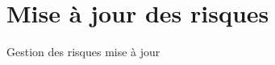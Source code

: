 \section{Mise à jour des risques}
\begin{table}[hp]
	\centering
	\caption{Gestion des risques mise à jour}
	
	\label{tab.risques}
\end{table}